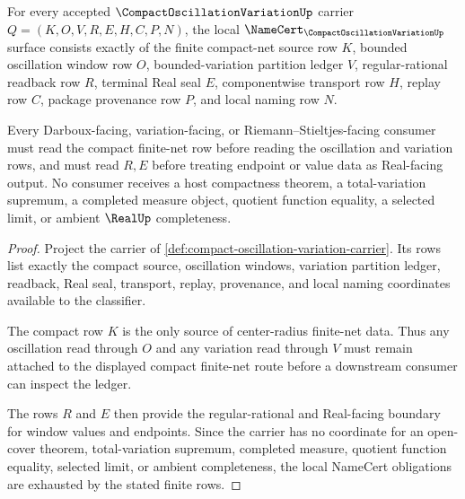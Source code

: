 \begin{theorem}
\label{thm:compact-oscillation-variation-namecert-obligations}
For every accepted $\CompactOscillationVariationUp$ carrier $Q=(K,O,V,R,E,H,C,P,N)$, the local $\NameCert_{\CompactOscillationVariationUp}$ surface consists exactly of the finite compact-net source row $K$, bounded oscillation window row $O$, bounded-variation partition ledger $V$, regular-rational readback row $R$, terminal Real seal $E$, componentwise transport row $H$, replay row $C$, package provenance row $P$, and local naming row $N$.

Every Darboux-facing, variation-facing, or Riemann--Stieltjes-facing consumer must read the compact finite-net row before reading the oscillation and variation rows, and must read $R,E$ before treating endpoint or value data as Real-facing output. No consumer receives a host compactness theorem, a total-variation supremum, a completed measure object, quotient function equality, a selected limit, or ambient $\RealUp$ completeness.
\end{theorem}
\begin{proof}
Project the carrier of \autoref{def:compact-oscillation-variation-carrier}. Its rows list exactly the compact source, oscillation windows, variation partition ledger, readback, Real seal, transport, replay, provenance, and local naming coordinates available to the classifier.

The compact row $K$ is the only source of center-radius finite-net data. Thus any oscillation read through $O$ and any variation read through $V$ must remain attached to the displayed compact finite-net route before a downstream consumer can inspect the ledger.

The rows $R$ and $E$ then provide the regular-rational and Real-facing boundary for window values and endpoints. Since the carrier has no coordinate for an open-cover theorem, total-variation supremum, completed measure, quotient function equality, selected limit, or ambient completeness, the local NameCert obligations are exhausted by the stated finite rows.
\end{proof}


